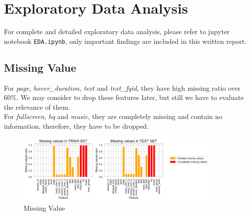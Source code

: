 \documentclass[11pt,a4paper]{article}
\begin{document}
    \section{Exploratory Data Analysis}
    For complete and detailed exploratory data analysis, please refer to jupyter notebook \texttt{EDA.ipynb}, only important findings are included in this written report.

    \subsection{Missing Value}
    For \textit{page}, \textit{hover\_duration}, \textit{text} and \textit{text\_fqid}, they have high missing ratio over 60\%. We may consider to drop these features later, but still we have to evaluate the relevance of them. \\
    For \textit{fullscreen}, \textit{hq} and \textit{music}, they are completely missing and contain no information, therefore, they have to be dropped.
    \begin{figure}[H]
        \centering
        \includegraphics[width = 0.9\textwidth]{EDA_plot/missing_value.pdf}
        \caption{Missing Value}
        \label{fig:missing_value}
    \end{figure}
\end{document}
